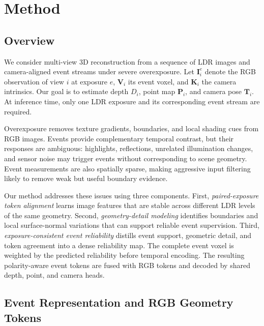 
\section{Method}
\label{sec:method}

\subsection{Overview}
\label{sec:method_overview}

We consider multi-view 3D reconstruction from a sequence of LDR images and
camera-aligned event streams under severe overexposure. Let
$\bm{I}_{i}^{e}$ denote the RGB observation of view $i$ at exposure $e$,
$\bm{V}_{i}$ its event voxel, and $\bm{K}_{i}$ the camera intrinsics. Our goal
is to estimate depth $D_i$, point map $\bm{P}_i$, and camera pose $\bm{T}_i$.
At inference time, only one LDR exposure and its corresponding event stream
are required.

Overexposure removes texture gradients, boundaries, and local shading cues
from RGB images. Events provide complementary temporal contrast, but their
responses are ambiguous: highlights, reflections, unrelated illumination
changes, and sensor noise may trigger events without corresponding to scene
geometry. Event measurements are also spatially sparse, making aggressive
input filtering likely to remove weak but useful boundary evidence.

Our method addresses these issues using three components. First,
\emph{paired-exposure token alignment} learns image features that are stable
across different LDR levels of the same geometry. Second,
\emph{geometry-detail modeling} identifies boundaries and local surface-normal
variations that can support reliable event supervision. Third,
\emph{exposure-consistent event reliability} distills event support, geometric
detail, and token agreement into a dense reliability map. The complete event
voxel is weighted by the predicted reliability before temporal encoding. The
resulting polarity-aware event tokens are fused with RGB tokens and decoded by
shared depth, point, and camera heads.

\subsection{Event Representation and RGB Geometry Tokens}
\label{sec:event_and_coarse}

